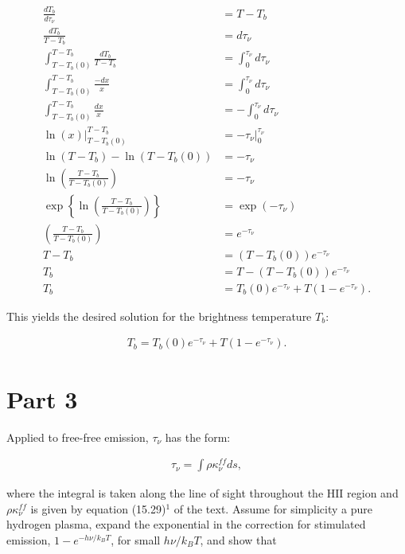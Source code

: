 \documentclass[12pt]{article}
\begin{document}
\begin{equation*}
\begin{split}
    \frac{dT_b}{d\tau_\nu} &= T - T_b \\
    \frac{dT_b}{T - T_b} &= d\tau_\nu \\
    \int_{T-T_b(0)}^{T-T_b}\frac{dT_b}{T - T_b} &= \int_0^{\tau_\nu}d\tau_\nu \\
    \int_{T-T_b(0)}^{T-T_b}\frac{-dx}{x} &= \int_0^{\tau_\nu}d\tau_\nu \\
    \int_{T-T_b(0)}^{T-T_b}\frac{dx}{x} &= -\int_0^{\tau_\nu}d\tau_\nu \\
    \ln(x)\rvert_{T-T_b(0)}^{T-T_b} &= -\tau_\nu\rvert_0^{\tau_\nu} \\
    \ln(T-T_b) - \ln(T-T_b(0)) &= -\tau_\nu \\
    \ln\left(\frac{T-T_b}{T-T_b(0)}\right) &= -\tau_\nu \\
    \exp\left\{\ln\left(\frac{T-T_b}{T-T_b(0)}\right)\right\} &= \exp(-\tau_\nu) \\
    \left(\frac{T-T_b}{T-T_b(0)}\right) &= e^{-\tau_\nu} \\
    T-T_b &= (T-T_b(0))e^{-\tau_\nu} \\
    T_b &= T - (T-T_b(0))e^{-\tau_\nu} \\
    T_b &= T_b(0)e^{-\tau_\nu} + T(1-e^{-\tau_\nu}).
\end{split}
\end{equation*}

{\noindent}This yields the desired solution for the brightness temperature $T_b$:

\begin{align*}
    \boxed{T_b = T_b(0)e^{-\tau_\nu} + T(1-e^{-\tau_\nu})}.
\end{align*}


\section*{Part 3}

Applied to free-free emission, $\tau_\nu$ has the form:

\begin{align*}
\tau_\nu = \int \rho\kappa_\nu^{ff}ds,
\end{align*}

{\noindent}where the integral is taken along the line of sight throughout the $\mathrm{HII}$ region and $\rho\kappa_\nu^{ff}$ is given by equation (15.29)$^1$ of the text. Assume for simplicity a pure hydrogen plasma, expand the exponential in the correction for stimulated emission, $1-e^{-h\nu/k_BT}$, for small $h\nu/k_BT$, and show that 
\end{document}
